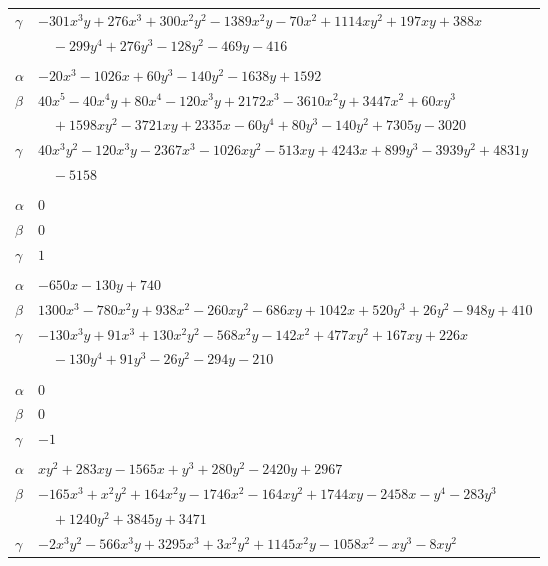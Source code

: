 \documentclass[11pt]{article}
\begin{document}
\begin{longtable}{@{}ll@{}}
$\gamma$ & $-301x^{3}y+276x^{3}+300x^{2}y^{2}-1389x^{2}y-70x^{2}+1114xy^{2}+197xy+388x$\\
 & $\quad -299y^{4}+276y^{3}-128y^{2}-469y-416$\\
\addlinespace[3pt]
\multicolumn{2}{@{}l}{$\{i,j\}=\{10,81\}$, $k_{ij}=2\cdot 3\cdot 7\cdot 13$}\\
$\alpha$ & $-20x^{3}-1026x+60y^{3}-140y^{2}-1638y+1592$\\
$\beta$ & $40x^{5}-40x^{4}y+80x^{4}-120x^{3}y+2172x^{3}-3610x^{2}y+3447x^{2}+60xy^{3}$\\
 & $\quad +1598xy^{2}-3721xy+2335x-60y^{4}+80y^{3}-140y^{2}+7305y-3020$\\
$\gamma$ & $40x^{3}y^{2}-120x^{3}y-2367x^{3}-1026xy^{2}-513xy+4243x+899y^{3}-3939y^{2}+4831y$\\
 & $\quad -5158$\\
\addlinespace[3pt]
\multicolumn{2}{@{}l}{$\{i,j\}=\{10,90\}$, $k_{ij}=2$}\\
$\alpha$ & $0$\\
$\beta$ & $0$\\
$\gamma$ & $1$\\
\addlinespace[3pt]
\multicolumn{2}{@{}l}{$\{i,j\}=\{10,101\}$, $k_{ij}=2\cdot 3^{2}\cdot 5$}\\
$\alpha$ & $-650x-130y+740$\\
$\beta$ & $1300x^{3}-780x^{2}y+938x^{2}-260xy^{2}-686xy+1042x+520y^{3}+26y^{2}-948y+410$\\
$\gamma$ & $-130x^{3}y+91x^{3}+130x^{2}y^{2}-568x^{2}y-142x^{2}+477xy^{2}+167xy+226x$\\
 & $\quad -130y^{4}+91y^{3}-26y^{2}-294y-210$\\
\addlinespace[3pt]
\multicolumn{2}{@{}l}{$\{i,j\}=\{11,19\}$, $k_{ij}=1$}\\
$\alpha$ & $0$\\
$\beta$ & $0$\\
$\gamma$ & $-1$\\
\addlinespace[3pt]
\multicolumn{2}{@{}l}{$\{i,j\}=\{11,24\}$, $k_{ij}=2^{3}\cdot 3^{2}\cdot 7$}\\
$\alpha$ & $xy^{2}+283xy-1565x+y^{3}+280y^{2}-2420y+2967$\\
$\beta$ & $-165x^{3}+x^{2}y^{2}+164x^{2}y-1746x^{2}-164xy^{2}+1744xy-2458x-y^{4}-283y^{3}$\\
 & $\quad +1240y^{2}+3845y+3471$\\
$\gamma$ & $-2x^{3}y^{2}-566x^{3}y+3295x^{3}+3x^{2}y^{2}+1145x^{2}y-1058x^{2}-xy^{3}-8xy^{2}$\\

\end{longtable}
\end{document}
